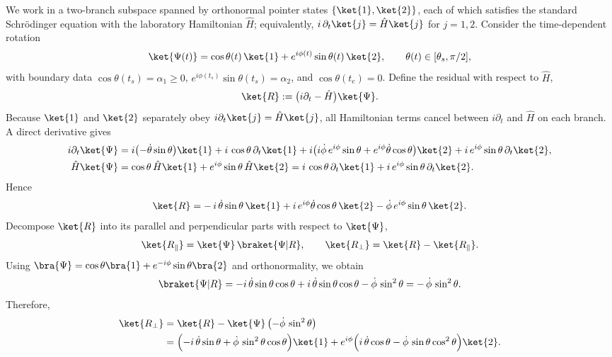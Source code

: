 \documentclass[11pt,letterpaper]{article}
\theoremstyle{definition}
\begin{document}
We work in a two-branch subspace spanned by orthonormal pointer states $\{\ket{1},\ket{2}\}$, each of which satisfies the standard Schrödinger equation with the laboratory Hamiltonian $\hat H$; equivalently, $i\,\partial_t\ket{j}=\hat H\ket{j}$ for $j=1,2$. Consider the time-dependent rotation
\begin{equation}
\ket{\Psi(t)}=\cos\theta(t)\,\ket{1}+e^{i\phi(t)}\sin\theta(t)\,\ket{2},
\qquad \theta(t)\in[\theta_s,\pi/2],
\label{eq:A-two-branch-ansatz}
\end{equation}
with boundary data $\cos\theta(t_s)=\alpha_1\ge 0$, $e^{i\phi(t_s)}\sin\theta(t_s)=\alpha_2$, and $\cos\theta(t_e)=0$. Define the residual with respect to $\hat H$,
\begin{equation}
\ket{R}:=\bigl(i\partial_t-\hat H\bigr)\ket{\Psi}.
\end{equation}
Because $\ket{1}$ and $\ket{2}$ separately obey $i\partial_t\ket{j}=\hat H\ket{j}$, all Hamiltonian terms cancel between $i\partial_t$ and $\hat H$ on each branch. A direct derivative gives
\begin{align}
i\partial_t\ket{\Psi}
&= i\bigl(-\dot\theta\sin\theta\bigr)\ket{1}
   + i\,\cos\theta\,\partial_t\ket{1}
   + i\bigl(i\dot\phi\,e^{i\phi}\sin\theta + e^{i\phi}\dot\theta\cos\theta\bigr)\ket{2}
   + i\,e^{i\phi}\sin\theta\,\partial_t\ket{2},\\
\hat H\ket{\Psi}
&= \cos\theta\,\hat H\ket{1}+e^{i\phi}\sin\theta\,\hat H\ket{2}
 = i\,\cos\theta\,\partial_t\ket{1}+i\,e^{i\phi}\sin\theta\,\partial_t\ket{2}.
\end{align}
Hence
\begin{equation}
\ket{R}
= -\,i\,\dot\theta\sin\theta\,\ket{1}
 + i\,e^{i\phi}\dot\theta\cos\theta\,\ket{2}
 - \dot\phi\,e^{i\phi}\sin\theta\,\ket{2}.
\label{eq:A-R-raw}
\end{equation}
Decompose $\ket{R}$ into its parallel and perpendicular parts with respect to $\ket{\Psi}$,
\begin{equation}
\ket{R_\parallel}=\ket{\Psi}\,\braket{\Psi|R},\qquad
\ket{R_\perp}=\ket{R}-\ket{R_\parallel}.
\end{equation}
Using $\bra{\Psi}=\cos\theta\bra{1}+e^{-i\phi}\sin\theta\bra{2}$ and orthonormality, we obtain
\begin{equation}
\braket{\Psi|R}
= -i\,\dot\theta\sin\theta\cos\theta
  + i\,\dot\theta\sin\theta\cos\theta
  - \dot\phi\,\sin^2\theta
= -\,\dot\phi\,\sin^2\theta.
\label{eq:A-parallel}
\end{equation}
Therefore,
\begin{align}
\ket{R_\perp}
&=\ket{R}-\ket{\Psi}\,\bigl(-\dot\phi\,\sin^2\theta\bigr)\nonumber\\
&=\Bigl(-i\,\dot\theta\sin\theta+\dot\phi\,\sin^2\theta\cos\theta\Bigr)\ket{1}
 + e^{i\phi}\Bigl(i\,\dot\theta\cos\theta-\dot\phi\,\sin\theta\cos^2\theta\Bigr)\ket{2}.
\label{eq:A-Rperp}
\end{align}
\end{document}
